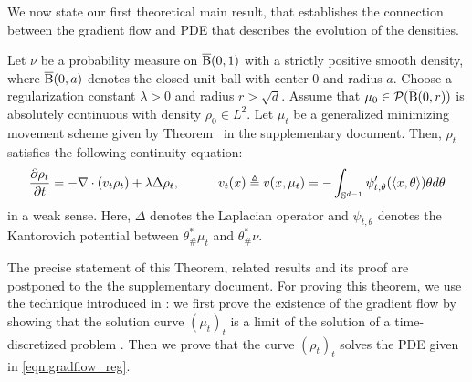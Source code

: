 We now state our first theoretical main result, that establishes the connection between the gradient flow and PDE that describes the evolution of the densities.
\begin{thm}
\label{thm:continuity}
Let $\nu$ be a probability measure on $\operatorname{\overline{B}}(0,1)$ with a strictly positive smooth density, where $\operatorname{\overline{B}}(0,a)$ denotes the closed unit ball with center $0$ and radius $a$. Choose a regularization constant $\lambda > 0$ and radius $r > \sqrt{d}$. Assume that $\mu_0 \in \mathcal{P}(\operatorname{\overline{B}}(0,r))$ is absolutely continuous with density $\rho_0 \in L^2$. Let $\mu_t$ be a generalized minimizing movement scheme given by Theorem~ in the supplementary document. Then, $\rho_t$ satisfies the following continuity equation:
\begin{align}
\frac{\partial \rho_t}{\partial t}   = -\nabla \cdot (v_t \rho_t) + \lambda \Delta \rho_t,  \quad \quad \quad v_t(x) \triangleq v(x,\mu_t) = - \int_{\mathbb{S}^{d-1}} \psi_{t, \theta}'(\langle x , \theta \rangle ) \theta d\theta  \label{eqn:gradflow_reg}
\end{align}
in a weak sense. Here, $\Delta$ denotes the Laplacian operator and $\psi_{t,\theta}$ denotes the Kantorovich potential between $\theta^*_{\#}\mu_t$ and $\theta^*_{\#}\nu$.
\end{thm}
The precise statement of this Theorem, related results and its proof are postponed to the the supplementary document. For proving this theorem, we use the technique introduced in \cite{bonnotte2013unidimensional}: we first prove the existence of the gradient flow by showing that the solution curve $(\mu_t)_t$ is a limit of the solution of a time-discretized problem \cite{jordan1998variational}. Then we prove that the curve $(\rho_t)_t$ solves the PDE given in \eqref{eqn:gradflow_reg}.





